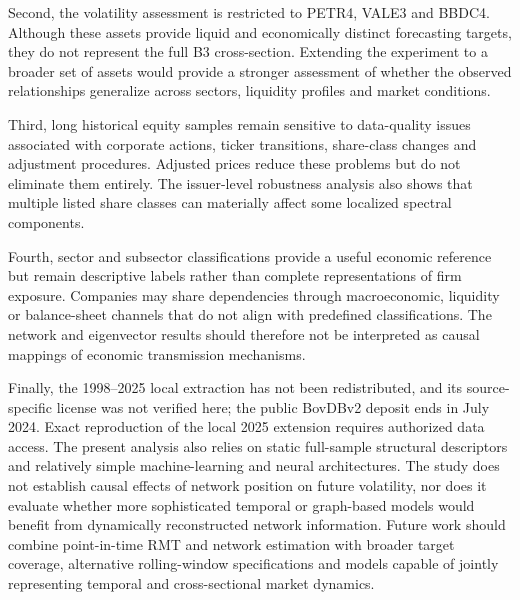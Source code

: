 Second, the volatility assessment is restricted to PETR4, VALE3 and BBDC4. Although these assets provide liquid and economically distinct forecasting targets, they do not represent the full B3 cross-section. Extending the experiment to a broader set of assets would provide a stronger assessment of whether the observed relationships generalize across sectors, liquidity profiles and market conditions.

Third, long historical equity samples remain sensitive to data-quality issues associated with corporate actions, ticker transitions, share-class changes and adjustment procedures. Adjusted prices reduce these problems but do not eliminate them entirely. The issuer-level robustness analysis also shows that multiple listed share classes can materially affect some localized spectral components.

Fourth, sector and subsector classifications provide a useful economic reference but remain descriptive labels rather than complete representations of firm exposure. Companies may share dependencies through macroeconomic, liquidity or balance-sheet channels that do not align with predefined classifications. The network and eigenvector results should therefore not be interpreted as causal mappings of economic transmission mechanisms.

Finally, the 1998--2025 local extraction has not been redistributed, and its source-specific license was not verified here; the public BovDBv2 deposit ends in July 2024. Exact reproduction of the local 2025 extension requires authorized data access. The present analysis also relies on static full-sample structural descriptors and relatively simple machine-learning and neural architectures. The study does not establish causal effects of network position on future volatility, nor does it evaluate whether more sophisticated temporal or graph-based models would benefit from dynamically reconstructed network information. Future work should combine point-in-time RMT and network estimation with broader target coverage, alternative rolling-window specifications and models capable of jointly representing temporal and cross-sectional market dynamics.
